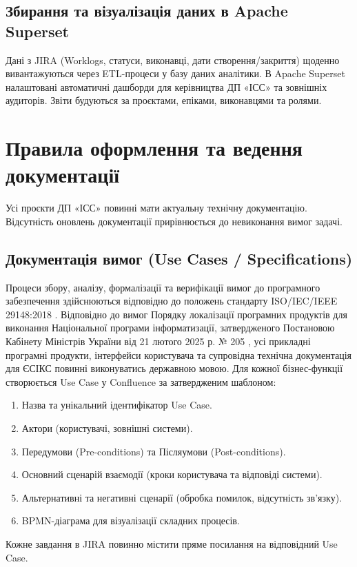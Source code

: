 \documentclass{article}
\begin{document}
\subsection{Збирання та візуалізація даних в Apache Superset}
Дані з JIRA (Worklogs, статуси, виконавці, дати створення/закриття) щоденно вивантажуються через ETL-процеси у базу даних аналітики. В Apache Superset налаштовані автоматичні дашборди для керівництва ДП «ІСС» та зовнішніх аудиторів. Звіти будуються за проєктами, епіками, виконавцями та ролями.

\section{Правила оформлення та ведення документації}

Усі проєкти ДП «ІСС» повинні мати актуальну технічну документацію. Відсутність оновлень документації прирівнюється до невиконання вимог задачі.

\subsection{Документація вимог (Use Cases / Specifications)}
Процеси збору, аналізу, формалізації та верифікації вимог до програмного забезпечення здійснюються відповідно до положень стандарту ISO/IEC/IEEE 29148:2018 \cite{iso29148}. Відповідно до вимог Порядку локалізації програмних продуктів для виконання Національної програми інформатизації, затвердженого Постановою Кабінету Міністрів України від 21 лютого 2025 р. № 205 \cite{kmu205}, усі прикладні програмні продукти, інтерфейси користувача та супровідна технічна документація для ЄСІКС повинні виконуватись державною мовою. Для кожної бізнес-функції створюється Use Case у Confluence за затвердженим шаблоном:
\begin{enumerate}
    \item Назва та унікальний ідентифікатор Use Case.
    \item Актори (користувачі, зовнішні системи).
    \item Передумови (Pre-conditions) та Післяумови (Post-conditions).
    \item Основний сценарій взаємодії (кроки користувача та відповіді системи).
    \item Альтернативні та негативні сценарії (обробка помилок, відсутність зв'язку).
    \item BPMN-діаграма для візуалізації складних процесів.
\end{enumerate}
Кожне завдання в JIRA повинно містити пряме посилання на відповідний Use Case.
\end{document}
